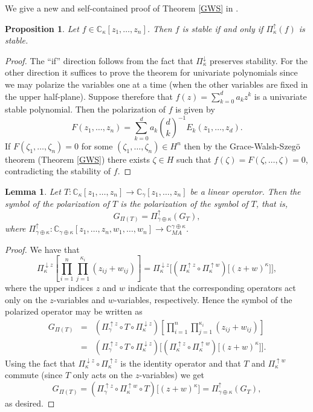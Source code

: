 \documentclass[10pt,reqno]{amsart}
\theoremstyle{plain}
\newtheorem{proposition}[theorem]{Proposition}
\newtheorem{lemma}[theorem]{Lemma}
\theoremstyle{definition}
\theoremstyle{remark}
\numberwithin{equation}{section}
\newcommand{\CC}{\mathbb{C}}
\newcommand{\CM}{\mathbb{C}_{ {MA}}}
\begin{document}
We give a new and self-contained 
proof of Theorem \ref{GWS} in \cite[\S 2]{BB-II}.

\begin{proposition}\label{gws}
Let $f \in \CC_\kappa[z_1,\ldots, z_n]$. Then $f$ is stable if and only 
if $\Pi_\kappa^\uparrow(f)$ is stable. 
\end{proposition}

\begin{proof}
The ``if'' direction follows from the fact that  $\Pi_\kappa^\downarrow$ 
preserves stability. For the other direction it suffices to prove the theorem 
for univariate polynomials since we may polarize the variables one at a time 
(when the other variables are fixed in the upper half-plane). Suppose therefore
that $f(z)=\sum_{k=0}^d a_k z^k$ is a univariate stable polynomial. Then the 
polarization of $f$ is given by 
$$
F(z_1,\ldots, z_n)= \sum_{k=0}^d a_k {\binom d k}^{-1}E_k(z_1,\ldots, z_d). 
$$
If $F(\zeta_1,\ldots, \zeta_n) = 0$ for some $(\zeta_1,\ldots, \zeta_n) 
\in H^n$ then by the Grace-Walsh-Szeg\"o theorem (Theorem \ref{GWS}) there 
exists $\zeta \in H$ such that $f(\zeta) = F(\zeta,\ldots, \zeta) = 0$, 
contradicting the stability of $f$. 
\end{proof}
 
\begin{lemma}\label{polarized-symbol}
Let $T: \CC_\kappa[z_1,\ldots, z_n] \rightarrow  
\CC_\gamma [z_1,\ldots, z_n]$ be a linear operator. Then the symbol of the 
polarization of $T$ is the polarization of the symbol of $T$, that is,
$$
G_{\Pi(T)} = \Pi_{\gamma \oplus \kappa}^\uparrow(G_T), 
$$
where $\Pi_{\gamma \oplus \kappa}^\uparrow : 
\CC_{\gamma \oplus \kappa}[z_1,\ldots,z_n,w_1,\ldots, w_n] \rightarrow 
\CM^{\gamma \oplus \kappa}$. 
\end{lemma}

\begin{proof} 
We have that 
$$
\Pi_\kappa^{\downarrow z}\!\left[\prod_{i=1}^n\prod_{j=1}^{\kappa_i}
(z_{ij}+w_{ij})\right]=  
\Pi_\kappa^{\downarrow z}\Big[ (\Pi_{\kappa}^{\uparrow z}\circ 
\Pi_{\kappa}^{\uparrow w})\big[(z+w)^\kappa\big]\Big], 
$$
where the upper indices $z$ and $w$ indicate that the corresponding 
operators act only on the $z$-variables and 
$w$-variables, respectively. Hence the symbol of the polarized operator 
may be written as
\begin{eqnarray*}
G_{\Pi(T)}&=& (\Pi_\gamma^{\uparrow z}\circ T\circ \Pi_\kappa^{\downarrow z})
\left[ \prod_{i=1}^n\prod_{j=1}^{\kappa_i}(z_{ij}+w_{ij})\right] \\
&=&(\Pi_\gamma^{\uparrow z}\circ T\circ \Pi_\kappa^{\downarrow z})
\Big[ (\Pi_{\kappa}^{\uparrow z}\circ 
\Pi_{\kappa}^{\uparrow w})\big[(z+w)^\kappa\big]\Big].
\end{eqnarray*}
Using the fact that $\Pi_\kappa^{\downarrow z}\circ\Pi_{\kappa}^{\uparrow z}$  
is the identity operator and that $T$ and $\Pi_{\kappa}^{\uparrow w}$ commute 
(since $T$ only acts on the $z$-variables) we get 
$$
G_{\Pi(T)}= (\Pi_\gamma^{\uparrow z} \circ \Pi_{\kappa}^{\uparrow w}\circ T)
\big[(z+w)^\kappa\big]=\Pi_{\gamma \oplus \kappa}^\uparrow(G_T),
$$
as desired.
\end{proof}
\end{document}
